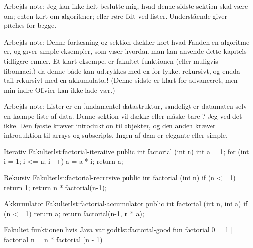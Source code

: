 	\begin{remark}  Arbejds-note:
		Jeg kan ikke helt beslutte mig, hvad denne sidste sektion skal være om; enten
		kort om algoritmer; eller røre lidt ved lister.
		Understående giver pitches for begge.
	\end{remark}

	\begin{remark}  Arbejds-note:
		Denne forlæsning og sektion dækker kort hvad Fanden en algoritme er, og
		giver simple eksempler, som viser hvordan man kan anvende dette kapitels
		tidligere emner.
		Et klart eksempel er fakultet-funktionen (eller muligvis fibonnaci,)
		da denne både kan udtrykkes med en for-lykke, rekursivt, og endda
		tail-rekursivt med en akkumulator! (Denne sidste er klart for
		advanceret, men min indre Olivier kan ikke lade vær.)
	\end{remark}

	\begin{remark}  Arbejds-note:
		Lister er en fundamentel datastruktur, sandeligt er datamaten selv en
		kæmpe liste af data.
		Denne sektion vil dække  eller måske bare
		? Jeg ved det ikke. Den første kræver introduktion til
		objekter, og den anden kræver introduktion til arrays og subscripts.
		Ingen af dem er elegante eller simple.
	\end{remark}


	\begin{JavaCode}{Iterativ Fakultet}{lst:factorial-iterative}
public int factorial (int n) {
	int a = 1;
	for (int i = 1; i <= n; i++)
		a = a * i;
	return a;
}
	\end{JavaCode}

	\begin{JavaCode}{Rekursiv Fakultet}{lst:factorial-recursive}
public int factorial (int n) {
	if (n <= 1)  return 1;
	return n * factorial(n-1);
}
	\end{JavaCode}

	\begin{JavaCode}{Akkumulator Fakultet}{lst:factorial-accumulator}
public int factorial (int n, int a) {
	if (n <= 1)  return a;
	return factorial(n-1, n * a);
}
	\end{JavaCode}

	\begin{JavaCode}{Fakultet funktionen hvis Java var godt}{lst:factorial-good}
fun factorial 0  =  1
  | factorial n  =  n * factorial (n - 1)
	\end{JavaCode}

\blindtext
